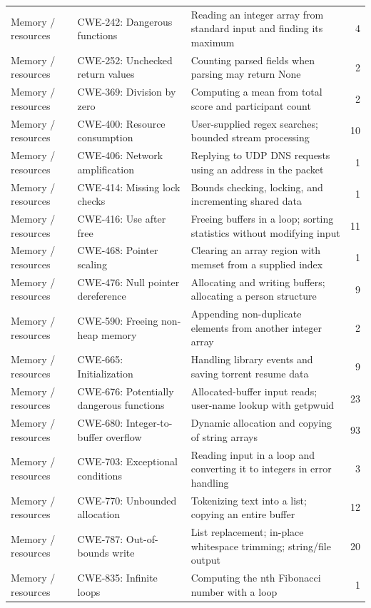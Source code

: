 \begin{longtable}{@{}>{\raggedright\arraybackslash}p{.13\linewidth} >{\raggedright\arraybackslash}p{.25\linewidth} >{\raggedright\arraybackslash}p{} r@{}}
Memory / resources & CWE-242: Dangerous functions & Reading an integer array from standard input and finding its maximum & 4 \\
Memory / resources & CWE-252: Unchecked return values & Counting parsed fields when parsing may return None & 2 \\
Memory / resources & CWE-369: Division by zero & Computing a mean from total score and participant count & 2 \\
Memory / resources & CWE-400: Resource consumption & User-supplied regex searches; bounded stream processing & 10 \\
Memory / resources & CWE-406: Network amplification & Replying to UDP DNS requests using an address in the packet & 1 \\
Memory / resources & CWE-414: Missing lock checks & Bounds checking, locking, and incrementing shared data & 1 \\
Memory / resources & CWE-416: Use after free & Freeing buffers in a loop; sorting statistics without modifying input & 11 \\
Memory / resources & CWE-468: Pointer scaling & Clearing an array region with memset from a supplied index & 1 \\
Memory / resources & CWE-476: Null pointer dereference & Allocating and writing buffers; allocating a person structure & 9 \\
Memory / resources & CWE-590: Freeing non-heap memory & Appending non-duplicate elements from another integer array & 2 \\
Memory / resources & CWE-665: Initialization & Handling library events and saving torrent resume data & 9 \\
Memory / resources & CWE-676: Potentially dangerous functions & Allocated-buffer input reads; user-name lookup with getpwuid & 23 \\
Memory / resources & CWE-680: Integer-to-buffer overflow & Dynamic allocation and copying of string arrays & 93 \\
Memory / resources & CWE-703: Exceptional conditions & Reading input in a loop and converting it to integers in error handling & 3 \\
Memory / resources & CWE-770: Unbounded allocation & Tokenizing text into a list; copying an entire buffer & 12 \\
Memory / resources & CWE-787: Out-of-bounds write & List replacement; in-place whitespace trimming; string/file output & 20 \\
Memory / resources & CWE-835: Infinite loops & Computing the nth Fibonacci number with a loop & 1 \\

\end{longtable}
